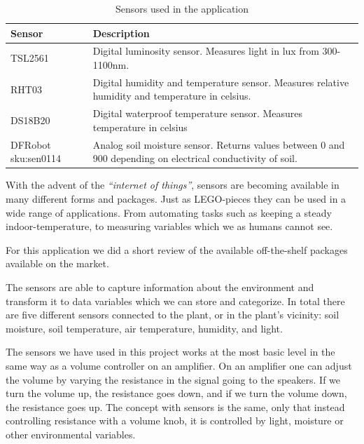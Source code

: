 \def\arraystretch{1.8}
\begin{table}
    \begin{tabular}{@{}lp{250pt}@{}}\toprule
    Sensor               & Description \\ \midrule                                                                                                  
    TSL2561              & Digital luminosity sensor. Measures light in lux from 300-1100nm.                                            \\ 
    RHT03                & Digital humidity and temperature sensor. Measures relative humidity and temperature in celsius.              \\ 
    DS18B20              & Digital waterproof temperature sensor. Measures temperature in celsius                                       \\ 
    DFRobot sku:sen0114  & Analog soil moisture sensor. Returns values between 0 and 900 depending on electrical conductivity of soil.  \\ \bottomrule
    \end{tabular}
    \caption{Sensors used in the application}
\end{table}


With the advent of the \emph{“internet of things”}, sensors are becoming available in many different forms and packages. Just as LEGO-pieces they can be used in a wide range of applications. From automating tasks such as keeping a steady indoor-temperature, to measuring variables which we as humans cannot see. 

For this application we did a short review of the available off-the-shelf packages available on the market. 

The sensors are able to capture information about the environment and transform it to data variables which we can store and categorize. In total there are five different sensors connected to the plant, or in the plant’s vicinity: soil moisture, soil temperature, air temperature, humidity, and light. 



The sensors we have used in this project works at the most basic level in the same way as a volume controller on an amplifier. On an amplifier one can adjust the volume by varying the resistance in the signal going to the speakers. If we turn the volume up, the resistance goes down, and if we turn the volume down, the resistance goes up. The concept with sensors is the same, only that instead controlling resistance with a volume knob, it is controlled by light, moisture or other environmental variables. 


